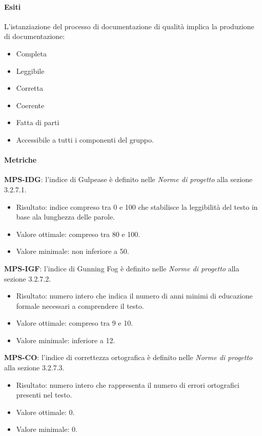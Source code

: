 \documentclass[../piano-di-qualifica.tex]{subfiles}
\begin{document}
\paragraph{Esiti}%
\label{par:esiti_doc}
L'istanziazione del processo di documentazione di qualità implica la produzione di documentazione:
\begin{itemize}
  \item Completa
  \item Leggibile
  \item Corretta
  \item Coerente
  \item Fatta di parti
  \item Accessibile a tutti i componenti del gruppo.
\end{itemize}

\paragraph{Metriche}%
\label{par:metriche_doc}

\textbf{MPS-IDG}: l'indice di Gulpease è definito nelle \textit{Norme di progetto} alla sezione 3.2.7.1.
\begin{itemize}
  \item Risultato: indice compreso tra 0 e 100 che stabilisce la leggibilità del testo in base ala lunghezza delle parole.
  \item Valore ottimale: compreso tra 80 e 100.
  \item Valore minimale: non inferiore a 50.
\end{itemize}

\textbf{MPS-IGF}: l'indice di Gunning Fog è definito nelle \textit{Norme di progetto} alla sezione 3.2.7.2.
\begin{itemize}
  \item Risultato: numero intero che indica il numero di anni minimi di educazione formale necessari a comprendere il testo.
  \item Valore ottimale: compreso tra 9 e 10.
  \item Valore minimale: inferiore a 12.
\end{itemize}

\textbf{MPS-CO}: l'indice di correttezza ortografica è definito nelle \textit{Norme di progetto} alla sezione 3.2.7.3.
\begin{itemize}
  \item Risultato: numero intero che rappresenta il numero di errori ortografici presenti nel testo.
  \item Valore ottimale: 0.
  \item Valore minimale: 0.
\end{itemize}
\end{document}
